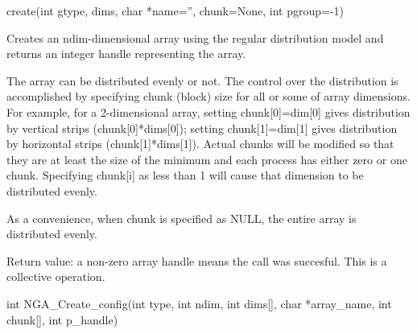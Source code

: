 \documentclass[12pt]{article}
\begin{document}
\begin{pyapi}
\begin{pycode}
create(int gtype, dims, char *name='', chunk=None, int pgroup=-1)
\end{pycode}
\begin{funcargs}
\end{funcargs}
\end{pyapi}

\dcoll

\begin{desc}

Creates an ndim-dimensional array using the regular distribution model and
returns an integer handle representing the array.

The array can be distributed evenly or not. The control over the distribution
is accomplished by specifying chunk (block) size for all or some of array
dimensions. For example, for a 2-dimensional array, setting chunk[0]=dim[0]
gives distribution by vertical strips (chunk[0]*dims[0]); setting
chunk[1]=dim[1] gives distribution by horizontal strips (chunk[1]*dims[1]).
Actual chunks will be modified so that they are at least the size of the
minimum and each process has either zero or one chunk. Specifying chunk[i] as
less than 1 will cause that dimension to be distributed evenly.

As a convenience, when chunk is specified as NULL, the entire array is
distributed evenly.

Return value: a non-zero array handle means the call was succesful.  This is a
collective operation.

\end{desc}


\begin{capi}
\begin{ccode}
int NGA_Create_config(int type, int ndim, int dims[], char *array_name,
                      int chunk[], int p_handle)
\end{ccode}
\begin{funcargs}
\end{funcargs}
\end{capi}
\end{document}
